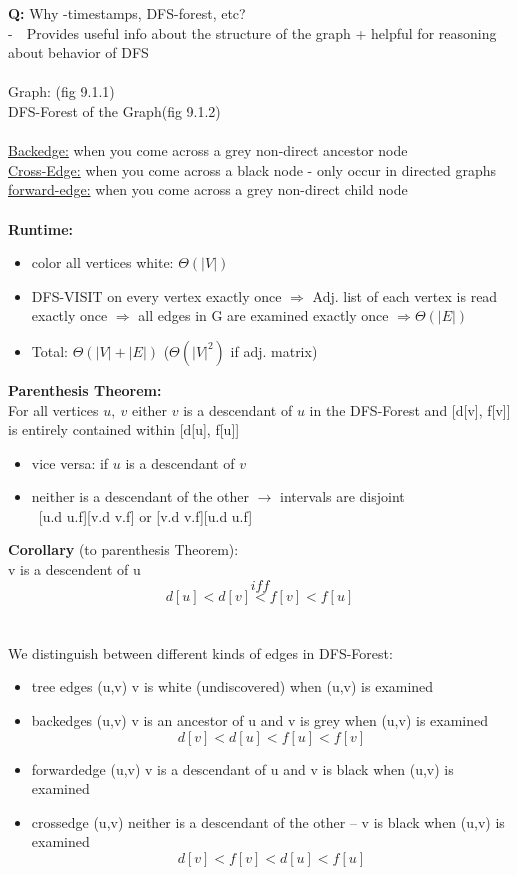 \documentclass{article}
\begin{document}
	\textbf{Q:} Why -timestamps, DFS-forest, etc?\\
	 -~~Provides useful info about the structure of the graph + helpful for reasoning about behavior of DFS\\\\
	 Graph: (fig 9.1.1)\\
	 DFS-Forest of the Graph(fig 9.1.2)\\\\
	 \underline{Backedge:} when you come across a grey non-direct ancestor node\\
	 \underline{Cross-Edge:} when you come across a black node - only occur in directed graphs\\
	 \underline{forward-edge:} when you come across a grey non-direct child node\\\\
	 \textbf{Runtime:}\begin{itemize}
	 	\item color all vertices white: $\Theta(|V|)$
	 	\item DFS-VISIT on every vertex exactly once $\Rightarrow$ Adj. list of each vertex is read exactly once $\Rightarrow$ all edges in G are examined exactly once $\Rightarrow \Theta(|E|)$
	 	\item Total: $\Theta(|V| +|E|)$  ($\Theta(|V|^2)$ if adj. matrix)\\ 
	 \end{itemize}
	 \textbf{Parenthesis Theorem:\\}
	 For all vertices $u,~v$ either $v$ is a descendant of $u$ in the DFS-Forest and [d[v], f[v]] is entirely contained within [d[u], f[u]] 
	 \begin{itemize}
	 	\item vice versa: if $u$ is a descendant of $v$
	 	\item neither is a descendant of the other $\rightarrow$ intervals are disjoint\\
	 	~[u.d u.f][v.d v.f] or [v.d v.f][u.d u.f]\\
	 \end{itemize}
	 \textbf{Corollary }(to parenthesis Theorem):\\
	 v is a descendent of u\\
	 $$iff$$
	 $$d[u]<d[v]<f[v]<f[u]$$\\\\
	 We distinguish between different kinds of edges in DFS-Forest:
	 \begin{itemize}
	 	\item tree edges (u,v) v is white (undiscovered) when (u,v) is examined
	 	\item backedges (u,v) v is an ancestor of u and v is grey when (u,v) is examined
	 	$$d[v]<d[u]<f[u]<f[v]$$
	 	\item forwardedge (u,v) v is a descendant of u and v is black when (u,v) is examined
	 	\item crossedge (u,v) neither is a descendant of the other -- v is black when (u,v) is examined
	 	$$d[v]<f[v]<d[u]<f[u]$$
	 \end{itemize}
	 
\end{document}
